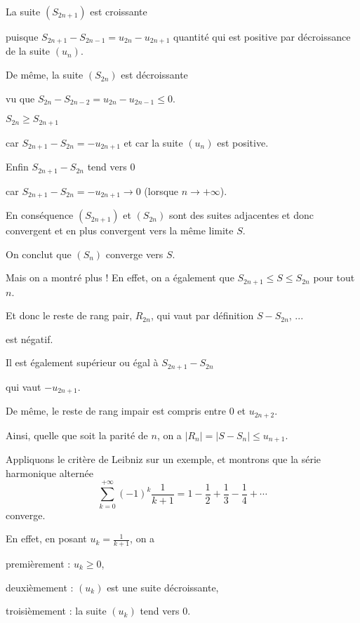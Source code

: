 \change
La suite $(S_{2n+1})$ est croissante 

\change
puisque $S_{2n+1}-S_{2n-1}=u_{2n}-u_{2n+1}$ quantité qui est positive par décroissance de la suite $(u_n)$.
  
\change
De même, la suite $(S_{2n})$ est décroissante

\change
vu que  $S_{2n}-S_{2n-2}= u_{2n}-u_{2n-1}\le 0$.
  
\change 
$S_{2n} \ge S_{2n+1}$ 

\change
car $S_{2n+1} - S_{2n} = -u_{2n+1} $ et car la suite $(u_n)$ est positive.
  
\change
Enfin $S_{2n+1} - S_{2n}$ tend vers $0$
  
\change
car $S_{2n+1} - S_{2n} = -u_{2n+1} \to 0$ (lorsque $n\to+\infty$).

\change
En conséquence $(S_{2n+1})$ et $(S_{2n})$ sont des suites adjacentes 
et donc convergent
et en plus convergent vers la même limite $S$.

\change
On conclut que $(S_n)$ converge vers $S$.

\change
Mais on a montré plus ! En effet, on a également que $S_{2n+1} \le S \le S_{2n}$ pour tout $n$.

\change
Et donc le reste de rang pair, $R_{2n}$, qui vaut par définition $S-S_{2n}$, ...

\change
est négatif.

\change
Il est également supérieur ou égal à $ S_{2n+1}-S_{2n}$ 

\change
qui vaut $-u_{2n+1}$.

\change
De même, le reste de rang impair est compris entre $0$ et $u_{2n+2}.$

\change
Ainsi, quelle que soit la parité de $n$, on a $|R_n|=|S-S_n|\le  u_{n+1}$.

\diapo

Appliquons le critère de Leibniz sur un exemple, et montrons que la série harmonique alternée
$$\sum_{k=0}^{+\infty} (-1)^{k} \frac{1}{k+1} = 1-\frac{1}{2}+\frac{1}{3}-\frac{1}{4} + \cdots $$
converge.

\change
En effet, en posant $u_k = \frac{1}{k+1}$, on a

\change
premièrement : $u_k\ge0$,

\change
deuxièmement : $(u_k)$ est une suite décroissante,

\change
troisièmement : la suite $(u_k)$ tend vers $0$.

